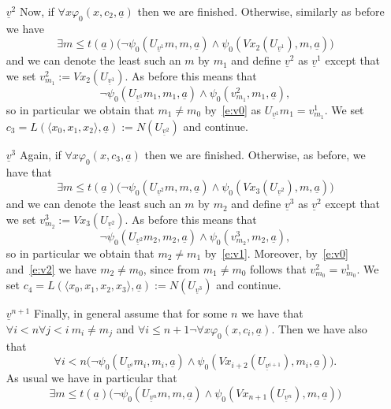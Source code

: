 \documentclass[1p]{elsarticle}
\newcommand{\tup}{\underline} %
\theoremstyle{plain}
\theoremstyle{definition}
\theoremstyle{remark}
\renewenvironment{proof}[1][]{\noindent{\bf Proof{#1}. }}{\nopagebreak[4]{\hspace*{\fill}
  $\Box$              %
 }{\vspace{2ex}}}
\renewcommand{\phi}{\varphi}
\theoremstyle{definition}
\begin{document}
{\begin{proof}
\begin{enumerate}
counterexample) 
\[
\exists m\leq t(\tup a) \big (\neg\psi_0(U_{\tup v^0}m,m,\tup a) \wedge \psi_0(Vx_1(U_{\tup v^0}),m,\tup a)\big)
\]
and 
so we can denote the least such an $m$ by $m_0$ (put $m_0:=0$ in case such an 
$m$ does not exist) and define $\tup v^1$ as $\tup v^0$ except that we set $v^1_{m_0}:=Vx_1(U_{\tup v^0})$.
Furthermore, we set 
$c_2=L(\langle x_0,x_1\rangle,\tup a):=N(U_{\tup v^1})$. 
Note that we have \[ \neg\psi_0(U_{\tup v^0}m_0,m_0,\tup a) \wedge \psi_0(v^1_{m_0},m_0,\tup a). \tag{v0}\label{e:v0}\]
\item[$\tup v^2$] Now, if $\forall x \phi_0(x,c_2,\tup a)$ then we are finished. Otherwise, similarly as before we have 
\[
\exists m\leq t(\tup a) \big (\neg\psi_0(U_{\tup v^1}m,m,\tup a) \wedge \psi_0(Vx_2(U_{\tup v^1}),m,\tup a)\big)
\]
and we can denote the least such an $m$ by $m_1$ and define $\tup v^2$ as $\tup v^1$ except that we set $v^2_{m_1}:=Vx_2(U_{\tup v^1})$. As before this means that
\[ \neg\psi_0(U_{\tup v^1}m_1,m_1,\tup a) \wedge \psi_0(v^2_{m_1},m_1,\tup a), \tag{v1}\label{e:v1}\]
so in particular we obtain that $m_1\neq m_0$ by~\eqref{e:v0} as $U_{\tup v^1}m_1=v^1_{m_1}$. We set $c_3=L(\langle x_0,x_1,x_2\rangle,\tup a):=
N(U_{\tup v^2})$ and continue.
\item[$\tup v^3$] Again, if $\forall x \phi_0(x,c_3,\tup a)$ then we are finished. Otherwise, as before, we have that
\[
\exists m\leq t(\tup a) \big (\neg\psi_0(U_{\tup v^2}m,m,\tup a) \wedge \psi_0(Vx_3(U_{\tup v^2}),m,\tup a)\big)
\]
and we can denote the least such an $m$ by $m_2$ and define $\tup v^3$ as $\tup v^2$ except that we set $v^3_{m_2}:=Vx_3(U_{\tup v^2})$. As before this means that
\[ \neg\psi_0(U_{\tup v^2}m_2,m_2,\tup a) \wedge \psi_0(v^3_{m_2},m_2,\tup a), \tag{v2}\label{e:v2}\]
so in particular we obtain that $m_2\neq m_1$ by~\eqref{e:v1}. Moreover, by~\eqref{e:v0} and~\eqref{e:v2} we have $m_2\neq m_0$, since from $m_1\neq m_0$ follows that $v^2_{m_0}=v^1_{m_0}$.
 We set $c_4=L(\langle x_0,x_1,x_2,x_3\rangle,\tup a):=N(U_{\tup v^3})$ and continue.\\
\item[$\tup v^{n+1}$] Finally, in general assume that for some $n$ we have that $\forall i< n\forall j<i\ m_i\neq m_j$
 and $\forall i\leq n+1 \neg \forall x \phi_0(x,c_i,\tup a)$.
Then we have also that
\[ 
\forall i<n \big (\neg\psi_0(U_{\tup v^i}m_i,m_i,\tup a) \wedge \psi_0(Vx_{i+2}(U_{\tup v^{i+1}}),m_i,\tup a)\big). \tag{vi}\label{e:vi}
\]
As usual we have in particular that
\[ 
\exists m\leq t(\tup a) \big (\neg\psi_0(U_{\tup v^n}m,m,\tup a) \wedge \psi_0(Vx_{n+1}(U_{\tup v^n}),m,\tup a)\big)
\]
\end{enumerate}
\end{proof}}
\end{document}
